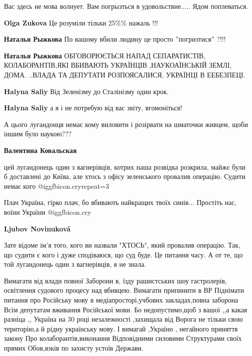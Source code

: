 \begin{itemize}
\begin{itemize}
Вас здесь не мова волнует. Вам погрызться в удовольствие..... Ядом поплеваться.

\textbf{Olga Zukova} Це розуміли тільки 25\%\% нажаль !!!

\textbf{Наталья Рыжкова} По вашому вбили людину це просто ”погризтися” ?!!!

\textbf{Наталья Рыжкова} ОБГОВОРЮЄТЬСЯ НАПАД СЕПАРАТИСТІВ, КОЛАБОРАНТІВ,ЯКІ ВБИВАЮТЬ УКРАЇНЦІВ ,НАУКОАЇНСЬКІЙ ЗЕМЛІ, ДОМА. ..ВЛАДА ТА ДЕПУТАТИ РОЗПОЯСАЛИСЯ, УКРАЇНЦІ В ЕЕБЕЗПЕЦІ.

\textbf{Halyna Saliy}
Від Зеленізму до Сталінізму один крок.

\textbf{Halyna Saliy} а я і не потребую від вас звіту, вгомоніться!
\end{itemize} %


А цього лугандонця немає кому виловити і розірвати на шматочки живцем, щоби
іншим було наукою???

\begin{itemize} %
\textbf{Валентина Ковальская} 

цей лугандонець один з вагнерівців, котрих наша розвідка розкрила, майжє були б
доставлені до Київа, але хтось з офісу зеленського провалив операцію. Судити
немає кого @igg{fbicon.cry}{repeat=3} 

Плач Україна, гірко плач, бо вбивають найкращих твоїх синів... Простіть нас,
воїни України  @igg{fbicon.cry} 


\textbf{Ljubov Novinuková} 

Зате відоме ім'я того, кого ви назвали "ХТОСЬ", який провалив операцію. Так, що
судити є кого і дуже сподіваюся, що суд буде. Це питання часу. А от те, що той
лугандонець один з вагнерівців, я не знала.

\end{itemize} %


\obeycr
Вимагати від влади повної
Заборони в, їзду рашистських шоу гастролерів, освітлення судового процесу над вбивцею.
Вимагати припинити в ВР
Піднімати питання про
Російську мову в медіапросторі,учбових закладах,повна заборона
Всім депутатам вживання
Російської мови.
Бо недопустимо,щоб з вашої ,,а какая разніца ,,
Україна на 30 році незалежності ,захищала від
Ворога не тільки свою територію,а й рідну українську мову.
І вимагай ,Україно , негайного приняття закону
Про колаборантів,виконання
Відповідними силовими
Структурами своїх прямих
Обов,язків по захисту устоїв
Держави.
\restorecr


\end{itemize}

